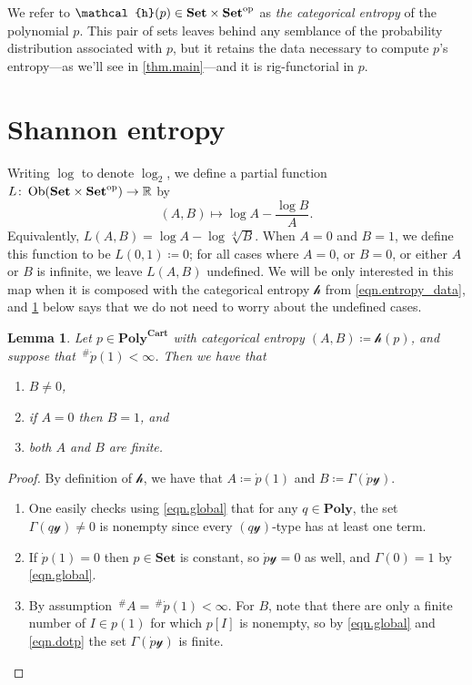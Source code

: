 \documentclass[11pt, one side, article]{memoir}
\theoremstyle{definition}
\theoremstyle{plain}
\newtheorem{lemma}[definitionx]{Lemma}
\DeclareMathOperator{\ob}{Ob}
\newcommand{\Cat}[1]{\mathbf{#1}}%
\newcommand{\card}{\,^{\#}}
\newcommand{\op}{^\tn{op}}
\newcommand{\tn}[1]{\textnormal{#1}}
\newcommand{\rr}{\mathbb{R}}
\newcommand{\smset}{\Cat{Set}}
\newcommand{\yon}{\mathcal{y}}
\newcommand{\poly}{\Cat{Poly}}
\newcommand{\polycart}{\poly^{\Cat{Cart}}}
\newcommand{\hh}{\mathcal{h}}
\newcommand{\0}{\textsf{0}}
\newcommand{\1}{\tn{\textsf{1}}}
\begin{document}
We refer to $\hh(p)\in\smset\times\smset\op$ as \emph{the categorical entropy} of the polynomial $p$. This pair of sets leaves behind any semblance of the probability distribution associated with $p$, but it retains the data necessary to compute $p$'s entropy---as we'll see in \cref{thm.main}---and it is rig-functorial in $p$. 

\section{Shannon entropy}\label{sec.entropy}

Writing $\log$ to denote $\log_2$, we define a partial function $L\colon\ob(\smset\times\smset\op)\to\rr$ by
\begin{equation}\label{eqn.L}
(A,B)\mapsto \log A-\frac{\log B}{A}.
\end{equation}
Equivalently, $L(A,B)=\log A-\log\sqrt[A]{B}$. When $A=0$ and $B=1$, we define this function to be $L(0,1)\coloneqq 0$; for all cases where $A=0$, or $B=0$, or either $A$ or $B$ is infinite, we leave $L(A,B)$ undefined. We will be only interested in this map when it is composed with the categorical entropy $\mathcal{h}$ from \eqref{eqn.entropy_data}, and \cref{lemma.dontworry} below says that we do not need to worry about the undefined cases.

\begin{lemma}\label{lemma.dontworry}
Let $p\in\polycart$ with categorical entropy $(A,B)\coloneqq\hh(p)$, and suppose that $\card\dot{p}(1)<\infty$. Then we have that
\begin{enumerate}[label=\roman*.]
	\item $B\neq 0$,
	\item if $A=0$ then $B=1$, and
	\item both $A$ and $B$ are finite.
\end{enumerate}
\end{lemma}
\begin{proof}
By definition of $\hh$, we have that $A\coloneqq\dot{p}(1)$ and $B\coloneqq\Gamma(\dot{p}\yon)$. 
\begin{enumerate}[label=\roman*.]
	\item One easily checks using \eqref{eqn.global} that for any $q\in\poly$, the set $\Gamma(q\yon)\neq0$ is nonempty since every $(q\yon)$-type has at least one term. 
	\item If $\dot{p}(1)=0$ then $p\in\smset$ is constant, so $\dot{p}\yon=0$ as well, and $\Gamma(0)=1$ by \eqref{eqn.global}.
	\item By assumption $\card A=\card\dot{p}(1)<\infty$. For $B$, note that there are only a finite number of $I\in p(1)$ for which $p[I]$ is nonempty, so by \eqref{eqn.global} and \eqref{eqn.dotp} the set $\Gamma(\dot{p}\yon)$ is finite.
\qedhere
\end{enumerate}
\end{proof}
\end{document}
